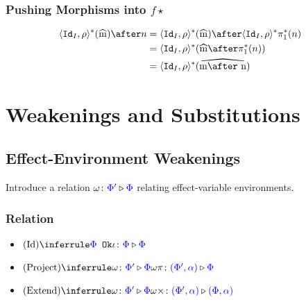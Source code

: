 \documentclass{report}
\begin{document}
\subsection{Pushing Morphisms into $f\star$}

\begin{align*}
    \pr{\Id{I}}{\rho}\star(\widehat{m})\after n &= \pr{\Id{I}}{\rho}\star(\widehat{m})\after\pr{\Id{I}}{\rho}\star\p\star(n)\\
    & = \pr{\Id{I}}{\rho}\star(\widehat{m}\after\pstar(n))\\
    &= \pr{\Id{I}}{\rho}\star(\widehat{m\after n})
\end{align*}


\chapter{Weakenings and Substitutions}
\section{Effect-Environment Weakenings}
        Introduce a relation $\omega \colon {\color{blue}\Phi'} \triangleright {\color {blue} \Phi}$ relating effect-variable environments.
        \subsection{Relation}

        \begin{itemize}
            \item $\ntreeruleI{Id}{\ok{\P}}{\wrel{\i}{\P}{\P}}$
            \item $\ntreeruleI{Project}{\wrel{\w}{\P'}{\P}}{\wrel{\w\pi}{(\P', \a)}{\P}}$
            \item $\ntreeruleI{Extend}{\wrel{\w}{\P'}{\P}}{\wrel{\w\x}{(\P', \a)}{(\P, \a)}}$
        \end{itemize}
\end{document}
